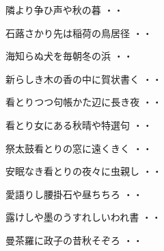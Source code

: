 \vspace{0.6cm}
\begin{shiika}隣より争ひ声や秋の暮
\hfill{・・}\end{shiika}
\vspace{0.6cm}
\begin{shiika}石蕗さかり先は稲荷の鳥居径
\hfill{・・}\end{shiika}
\vspace{0.6cm}
\begin{shiika}海知らぬ犬を毎朝冬の浜
\hfill{・・}\end{shiika}
\vspace{0.6cm}
\begin{shiika}新らしき木の香の中に賀状書く
\hfill{・・}\end{shiika}
\vspace{0.6cm}
\begin{shiika}看とりつつ句帳かた辺に長き夜
\hfill{・・}\end{shiika}
\vspace{0.6cm}
\begin{shiika}看とり女にある秋晴や特選句
\hfill{・・}\end{shiika}
\vspace{0.6cm}
\begin{shiika}祭太鼓看とりの窓に遠くきく
\hfill{・・}\end{shiika}
\vspace{0.6cm}
\begin{shiika}安眠なき看とりの夜々に虫親し
\hfill{・・}\end{shiika}
\vspace{0.6cm}
\begin{shiika}愛語りし腰掛石や昼ちちろ
\hfill{・・}\end{shiika}
\vspace{0.6cm}
\begin{shiika}露けしや墨のうすれしいわれ書
\hfill{・・}\end{shiika}
\vspace{0.6cm}
\begin{shiika}曼茶羅に政子の昔秋そぞろ
\hfill{・・}\end{shiika}
